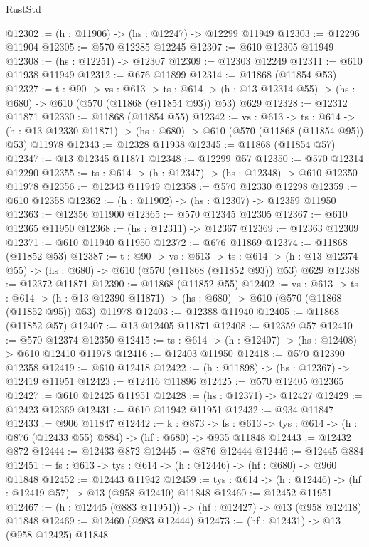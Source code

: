 \begin{lexlean}{RustStd}
\begin{coremodule}
@12302 := (h : @11906) -> (hs : @12247) -> @12299 @11949
@12303 := @12296 @11904
@12305 := @570 @12285 @12245
@12307 := @610 @12305 @11949
@12308 := (hs : @12251) -> @12307
@12309 := @12303 @12249
@12311 := @610 @11938 @11949
@12312 := @676 @11899
@12314 := @11868 (@11854 @53)
@12327 := {t : @90} ->
  {vs : @613} ->
  {ts : @614} -> (h : @13 @12314 @55) -> (hs : @680) -> @610 (@570 (@11868 (@11854 @93)) @53) @629
@12328 := @12312 @11871
@12330 := @11868 (@11854 @55)
@12342 := {vs : @613} ->
  {ts : @614} ->
  (h : @13 @12330 @11871) -> (hs : @680) -> @610 (@570 (@11868 (@11854 @95)) @53) @11978
@12343 := @12328 @11938
@12345 := @11868 (@11854 @57)
@12347 := @13 @12345 @11871
@12348 := @12299 @57
@12350 := @570 @12314 @12290
@12355 := {ts : @614} -> (h : @12347) -> (hs : @12348) -> @610 @12350 @11978
@12356 := @12343 @11949
@12358 := @570 @12330 @12298
@12359 := @610 @12358
@12362 := (h : @11902) -> (hs : @12307) -> @12359 @11950
@12363 := @12356 @11900
@12365 := @570 @12345 @12305
@12367 := @610 @12365 @11950
@12368 := (hs : @12311) -> @12367
@12369 := @12363 @12309
@12371 := @610 @11940 @11950
@12372 := @676 @11869
@12374 := @11868 (@11852 @53)
@12387 := {t : @90} ->
  {vs : @613} ->
  {ts : @614} -> (h : @13 @12374 @55) -> (hs : @680) -> @610 (@570 (@11868 (@11852 @93)) @53) @629
@12388 := @12372 @11871
@12390 := @11868 (@11852 @55)
@12402 := {vs : @613} ->
  {ts : @614} ->
  (h : @13 @12390 @11871) -> (hs : @680) -> @610 (@570 (@11868 (@11852 @95)) @53) @11978
@12403 := @12388 @11940
@12405 := @11868 (@11852 @57)
@12407 := @13 @12405 @11871
@12408 := @12359 @57
@12410 := @570 @12374 @12350
@12415 := {ts : @614} -> (h : @12407) -> (hs : @12408) -> @610 @12410 @11978
@12416 := @12403 @11950
@12418 := @570 @12390 @12358
@12419 := @610 @12418
@12422 := (h : @11898) -> (hs : @12367) -> @12419 @11951
@12423 := @12416 @11896
@12425 := @570 @12405 @12365
@12427 := @610 @12425 @11951
@12428 := (hs : @12371) -> @12427
@12429 := @12423 @12369
@12431 := @610 @11942 @11951
@12432 := @934 @11847
@12433 := @906 @11847
@12442 := {k : @873} ->
  {fs : @613} -> {tys : @614} -> (h : @876 (@12433 @55) @884) -> (hf : @680) -> @935 @11848
@12443 := @12432 @872
@12444 := @12433 @872
@12445 := @876 @12444
@12446 := @12445 @884
@12451 := {fs : @613} -> {tys : @614} -> (h : @12446) -> (hf : @680) -> @960 @11848
@12452 := @12443 @11942
@12459 := {tys : @614} -> (h : @12446) -> (hf : @12419 @57) -> @13 (@958 @12410) @11848
@12460 := @12452 @11951
@12467 := (h : @12445 (@883 @11951)) -> (hf : @12427) -> @13 (@958 @12418) @11848
@12469 := @12460 (@983 @12444)
@12473 := (hf : @12431) -> @13 (@958 @12425) @11848

\end{coremodule}
\end{lexlean}
